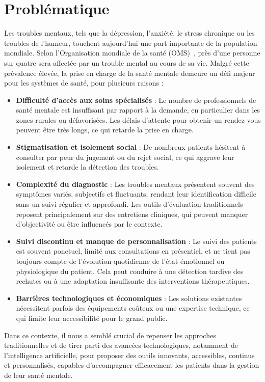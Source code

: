 \section{Problématique}
Les troubles mentaux, tels que la dépression, l’anxiété, le stress chronique ou les troubles de l’humeur, touchent aujourd’hui une part importante de la population mondiale. Selon l’Organisation mondiale de la santé (OMS)~\cite{oms_mental_health}, près d’une personne sur quatre sera affectée par un trouble mental au cours de sa vie. Malgré cette prévalence élevée, la prise en charge de la santé mentale demeure un défi majeur pour les systèmes de santé, pour plusieurs raisons :
\begin{itemize}
    \item \textbf{Difficulté d’accès aux soins spécialisés} : Le nombre de professionnels de santé mentale est insuffisant par rapport à la demande, en particulier dans les zones rurales ou défavorisées. Les délais d’attente pour obtenir un rendez-vous peuvent être très longs, ce qui retarde la prise en charge.
    \item \textbf{Stigmatisation et isolement social} : De nombreux patients hésitent à consulter par peur du jugement ou du rejet social, ce qui aggrave leur isolement et retarde la détection des troubles.
    \item \textbf{Complexité du diagnostic} : Les troubles mentaux présentent souvent des symptômes variés, subjectifs et fluctuants, rendant leur identification difficile sans un suivi régulier et approfondi. Les outils d’évaluation traditionnels reposent principalement sur des entretiens cliniques, qui peuvent manquer d’objectivité ou être influencés par le contexte.
    \item \textbf{Suivi discontinu et manque de personnalisation} : Le suivi des patients est souvent ponctuel, limité aux consultations en présentiel, et ne tient pas toujours compte de l’évolution quotidienne de l’état émotionnel ou physiologique du patient. Cela peut conduire à une détection tardive des rechutes ou à une adaptation insuffisante des interventions thérapeutiques.
    \item \textbf{Barrières technologiques et économiques} : Les solutions existantes nécessitent parfois des équipements coûteux ou une expertise technique, ce qui limite leur accessibilité pour le grand public.
\end{itemize}
Dans ce contexte, il nous a semblé crucial de repenser les approches traditionnelles et de tirer parti des avancées technologiques, notamment de l’intelligence artificielle, pour proposer des outils innovants, accessibles, continus et personnalisés, capables d’accompagner efficacement les patients dans la gestion de leur santé mentale.
